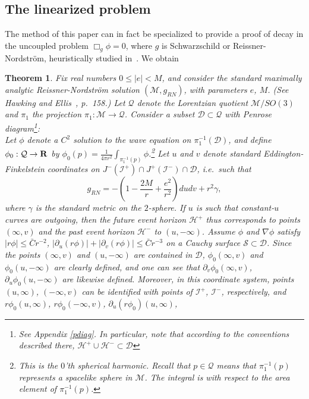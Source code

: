 \documentclass{article}
\newtheorem{theorem}{Theorem}[section]
\begin{document}
\subsection{The linearized problem}
\label{grpro}
The method of this paper can in fact be specialized to
provide a proof of decay in the uncoupled  problem $\Box_g\phi=0$,
where $g$ is Schwarzschild or Reissner-Nordstr\"om, heuristically
studied in~\cite{rpr:ns,gpp:de1, jb:gcc}. We obtain
\begin{theorem}
\label{unth}
Fix real numbers $0\le |e|< M$, and consider the standard maximally
analytic
Reissner-Nordstr\"om solution $(\mathcal{M},g_{RN})$, 
with parameters $e$, $M$. (See Hawking and Ellis~\cite{he:lssst}, p.~158.)
Let $\mathcal{Q}$ denote the Lorentzian quotient $\mathcal{M}/SO(3)$
and $\pi_1$ the projection $\pi_1:\mathcal{M}\to\mathcal{Q}$.
Consider a subset $\mathcal{D}\subset\mathcal{Q}$ with 
Penrose diagram\footnote{See Appendix \ref{pdiag}. In particular,
note that according to the conventions
described there, $\mathcal{H}^+\cup\mathcal{H}^-\subset\mathcal{D}$}:
\[

\]
Let $\phi$ denote a $C^2$ solution to the 
wave equation on $\pi_1^{-1}(\mathcal{D})$, and 
define $\phi_0:\mathcal{Q}\to{\bf R}$
by $\phi_0(p)=\frac1{4\pi r^2}\int_{\pi_1^{-1}(p)}\phi$.\footnote{This
is the $0$'th spherical harmonic. Recall that $p\in\mathcal{Q}$ means
that $\pi_1^{-1}(p)$ 
represents a spacelike sphere in $\mathcal{M}$. The integral
is with respect to the area element of $\pi_1^{-1}(p)$.}
Let $u$ and $v$ denote standard Eddington-Finkelstein coordinates on
$J^-(\mathcal{I}^+)\cap J^+(\mathcal{I}^-)\cap\mathcal{D}$,
i.e.~such that 
\[
g_{RN}=-\left(1-\frac{2M}r+\frac{e^2}{r^2}\right)dudv+r^2 \gamma,
\]
where $\gamma$ is the standard metric on the $2$-sphere.
If $u$ is such that constant-$u$ curves are outgoing, then
the future event horizon $\mathcal{H}^+$
thus corresponds to points $(\infty, v)$
and the past event horizon $\mathcal{H}^-$ to $(u, -\infty)$. 
Assume $\phi$ and $\nabla\phi$ satisfy $|r\phi|\le \bar{C}r^{-2}$, 
$|\partial_u(r\phi)|+|\partial_v(r\phi)|\le \bar{C}r^{-3}$ on a
Cauchy surface $\mathcal{S}\subset\mathcal{D}$. 
Since the points $(\infty,v)$ and $(u,-\infty)$ are contained in $\mathcal{D}$, 
$\phi_0(\infty,v)$ and $\phi_0(u,-\infty)$ are clearly defined,
and one can see that $\partial_v\phi_0(\infty,v)$, $\partial_u\phi_0(u,-\infty)$
are likewise defined. Moreover,
in this coordinate system, points $(u,\infty)$, $(-\infty,v)$ can be 
identified with points of $\mathcal{I}^+$, $\mathcal{I}^-$, respectively,
and $r\phi_0(u,\infty)$, $r\phi_0(-\infty,v)$, $\partial_u(r\phi_0)(u,\infty)$,

\end{theorem}
\end{document}
